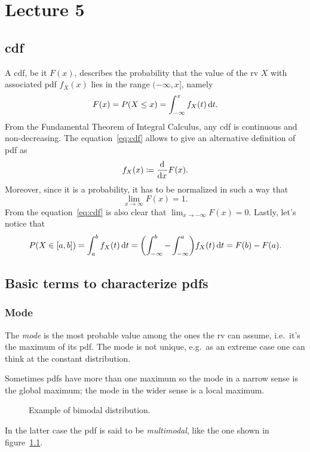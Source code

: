
\chapter{Lecture 5}

\section{\acl{cdf}}

A \ac{cdf}, be it $F(x)$, describes the probability that the value of the \ac{rv} $X$ with associated \ac{pdf} $f_X(x)$ lies in the range $(-\infty,x]$, namely
\begin{equation}\label{eq:cdf}
	F(x) = P(X\le x) = \int_{-\infty}^x f_X(t)\mathop{}\!\mathrm{d} t.
\end{equation}
From the Fundamental Theorem of Integral Calculus, any \ac{cdf} is continuous and non-decreasing.
The equation~\eqref{eq:cdf} allows to give an alternative definition of \ac{pdf} as
\begin{equation}
	f_X(x)\coloneqq \dfrac{\mathop{}\!\mathrm{d}^{}}{\mathop{}\!\mathrm{d} x^{}}F(x).
\end{equation}
Moreover, since it is a probability, it has to be normalized in such a way that
\begin{equation}
	\lim_{x\to\infty}F(x) = 1.
\end{equation}
From the equation~\eqref{eq:cdf} is also clear that $\lim_{x\to-\infty}F(x) = 0$.
Lastly, let's notice that
\begin{equation}
	P(X\in[a,b]) = \int_a^b f_X(t)\mathop{}\!\mathrm{d} t = \biggl(\int_{-\infty}^b - \int_{-\infty}^a\biggr) f_X(t)\mathop{}\!\mathrm{d} t = F(b) - F(a).
\end{equation}

\section{Basic terms to characterize \acsp{pdf}}
\subsection{Mode}

The \emph{mode} is the most probable value among the ones the \ac{rv} can assume, i.e.~it's the maximum of its \ac{pdf}.
The mode is not unique, e.g.~as an extreme case one can think at the constant distribution.


Sometimes \acp{pdf} have more than one maximum so the mode in a narrow sense is the global maximum; the mode in the wider sense is a local maximum.
\begin{figure}
	\centering
	
	\caption{Example of bimodal distribution.}
	\label{fig:multiModalPDF}
\end{figure}
In the latter case the \ac{pdf} is said to be \emph{multimodal}, like the one shown in figure~\ref{fig:multiModalPDF}.


